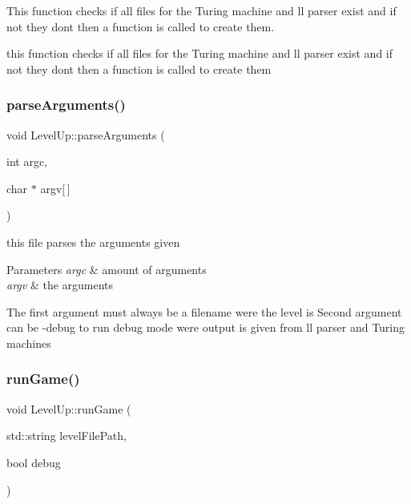 This function checks if all files for the Turing machine and ll parser exist and if not they don\textquotesingle{}t then a function is called to create them. 

this function checks if all files for the Turing machine and ll parser exist and if not they don\textquotesingle{}t then a function is called to create them \mbox{\label{classLevelUp_abfbb1057ebe51f215fbcbdb61a887f85}} 
\subsubsection{\texorpdfstring{parse\+Arguments()}{parseArguments()}}
{\footnotesize\ttfamily void Level\+Up\+::parse\+Arguments (\begin{DoxyParamCaption}\item[{int}]{argc,  }\item[{char $\ast$}]{argv\mbox{[}$\,$\mbox{]} }\end{DoxyParamCaption})\hspace{0.3cm}{\ttfamily [static]}}



this file parses the arguments given 


\begin{DoxyParams}{Parameters}
{\em argc} & amount of arguments \\
\hline
{\em argv} & the arguments\\
\hline
\end{DoxyParams}
The first argument must always be a filename were the level is Second argument can be -\/debug to run debug mode were output is given from ll parser and Turing machines \mbox{\label{classLevelUp_afee839cbfb2300f6229b4d82bbf2c269}} 
\subsubsection{\texorpdfstring{run\+Game()}{runGame()}}
{\footnotesize\ttfamily void Level\+Up\+::run\+Game (\begin{DoxyParamCaption}\item[{std\+::string}]{level\+File\+Path,  }\item[{bool}]{debug }\end{DoxyParamCaption})\hspace{0.3cm}{\ttfamily [static]}}



